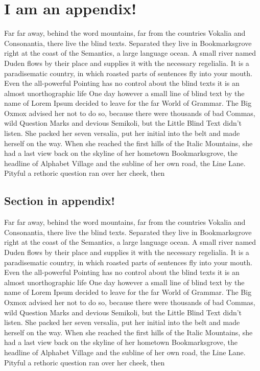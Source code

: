 \chapter{I am an appendix!}
\label{ap:blindtext}


Far far away, behind the word mountains, far from the countries Vokalia and
Consonantia, there live the blind texts. Separated they live in
Bookmarksgrove right at the coast of the Semantics, a large language
ocean. A small river named Duden flows by their place and supplies it with
the necessary regelialia. It is a paradisematic country, in which roasted
parts of sentences fly into your mouth. Even the all-powerful Pointing has
no control about the blind texts it is an almost unorthographic life One
day however a small line of blind text by the name of Lorem Ipsum decided
to leave for the far World of Grammar. The Big Oxmox advised her not to do
so, because there were thousands of bad Commas, wild Question Marks and
devious Semikoli, but the Little Blind Text didn't listen. She packed her
seven versalia, put her initial into the belt and made herself on the
way. When she reached the first hills of the Italic Mountains, she had a
last view back on the skyline of her hometown Bookmarksgrove, the headline
of Alphabet Village and the subline of her own road, the Line Lane. Pityful
a rethoric question ran over her cheek, then 

\section{Section in appendix!}
\label{sec:appsection}


Far far away, behind the word mountains, far from the countries Vokalia and
Consonantia, there live the blind texts. Separated they live in
Bookmarksgrove right at the coast of the Semantics, a large language
ocean. A small river named Duden flows by their place and supplies it with
the necessary regelialia. It is a paradisematic country, in which roasted
parts of sentences fly into your mouth. Even the all-powerful Pointing has
no control about the blind texts it is an almost unorthographic life One
day however a small line of blind text by the name of Lorem Ipsum decided
to leave for the far World of Grammar. The Big Oxmox advised her not to do
so, because there were thousands of bad Commas, wild Question Marks and
devious Semikoli, but the Little Blind Text didn't listen. She packed her
seven versalia, put her initial into the belt and made herself on the
way. When she reached the first hills of the Italic Mountains, she had a
last view back on the skyline of her hometown Bookmarksgrove, the headline
of Alphabet Village and the subline of her own road, the Line Lane. Pityful
a rethoric question ran over her cheek, then 

